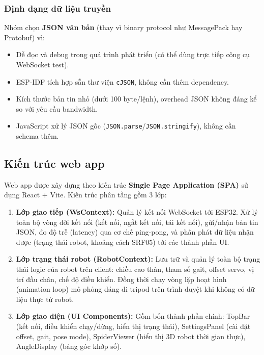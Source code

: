             \subsubsection{Định dạng dữ liệu truyền}

            \hspace{0.5cm} Nhóm chọn \textbf{JSON văn bản} (thay vì binary protocol như MessagePack hay Protobuf) vì:
            \begin{itemize}
                \item Dễ đọc và debug trong quá trình phát triển (có thể dùng trực tiếp công cụ WebSocket test).
                \item ESP-IDF tích hợp sẵn thư viện \texttt{cJSON}, không cần thêm dependency.
                \item Kích thước bản tin nhỏ (dưới 100 byte/lệnh), overhead JSON không đáng kể so với yêu cầu bandwidth.
                \item JavaScript xử lý JSON gốc (\texttt{JSON.parse}/\texttt{JSON.stringify}), không cần schema thêm.
            \end{itemize}

        \subsection{Kiến trúc web app}

        \hspace{0.5cm} Web app được xây dựng theo kiến trúc \textbf{Single Page Application (SPA)} sử dụng React + Vite. Kiến trúc phân tầng gồm 3 lớp:

        \begin{enumerate}
            \item \textbf{Lớp giao tiếp (WsContext):} Quản lý kết nối WebSocket tới ESP32. Xử lý toàn bộ vòng đời kết nối (kết nối, ngắt kết nối, tái kết nối), gửi/nhận bản tin JSON, đo độ trễ (latency) qua cơ chế ping-pong, và phân phát dữ liệu nhận được (trạng thái robot, khoảng cách SRF05) tới các thành phần UI.
            \item \textbf{Lớp trạng thái robot (RobotContext):} Lưu trữ và quản lý toàn bộ trạng thái logic của robot trên client: chiều cao thân, tham số gait, offset servo, vị trí đầu chân, chế độ điều khiển. Đồng thời chạy vòng lặp hoạt hình (animation loop) mô phỏng dáng đi tripod trên trình duyệt khi không có dữ liệu thực từ robot.
            \item \textbf{Lớp giao diện (UI Components):} Gồm bốn thành phần chính: TopBar (kết nối, điều khiển chạy/dừng, hiển thị trạng thái), SettingsPanel (cài đặt offset, gait, pose mode), SpiderViewer (hiển thị 3D robot thời gian thực), AngleDisplay (bảng góc khớp số).
        \end{enumerate}

